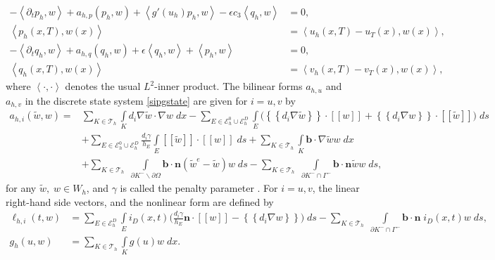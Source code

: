 \documentclass[preprint,12pt]{elsarticle}
\newcommand {\average}[1] {\mbox{$\left\{\!\!\left\{ #1 \right\}\!\!\right\}$}}
\newcommand {\jump}[1] {\mbox{$\left[\!\left[ #1 \right]\!\right]$}}
\newcommand {\la}[1] {\left\langle {#1} \right\rangle }
\begin{document}
\begin{equation}\label{sipgadj}
\begin{aligned}
-\la{ \partial_t p_h, w } + a_{h,p}(p_h,w) + \la{g'(u_h)p_h,w}-\epsilon c_3\la{q_h,w} &= 0, \\
\la{p_h(x,T),w(x)} &=  \la{ u_h(x, T)-u_T(x) ,w(x) },  \\
-\la{ \partial_t q_h, w } + a_{h,q}(q_h,w) + \epsilon \la{q_h,w}  + \la{p_h,w} &= 0, \\
 \la{q_h(x,T),w(x)} &=  \la{ v_h(x, T)-v_T(x) ,w(x) },
\end{aligned}
\end{equation}
where $\la{\cdot , \cdot}$ denotes the usual $L^2$-inner product. The bilinear forms $a_{h,u}$ and $a_{h,v}$ in the discrete state system \eqref{sipgstate} are given for $i=u,v$ by
\begin{equation*}
\begin{aligned}
a_{h,i}(\tilde{w},w)=& \sum \limits_{K \in \mathcal{T}_h} \int \limits_{K} d_i\nabla \tilde{w}  \cdot  \nabla w \; dx - \sum \limits_{E \in \mathcal{E}^0_h \cup \mathcal{E}^D_h} \int \limits_E \Big( \average{ d_i\nabla  \tilde{w}} \cdot \jump{w} + \average{ d_i\nabla w} \cdot \jump{\tilde{w}} \Big)  \; ds   \\
& + \sum \limits_{E \in \mathcal{E}^0_h \cup \mathcal{E}^D_h} \frac{d_i\gamma}{h_E} \int \limits_E \jump{\tilde{w}} \cdot \jump{w} \; ds + \sum \limits_{K \in \mathcal{T}_h} \int \limits_{K} \bm{b} \cdot \nabla \tilde{w} w  \; dx \\
&  + \sum \limits_{K \in \mathcal{T}_h}\; \int \limits_{\partial K^{-} \backslash \partial \Omega} \bm{b} \cdot \bm{n} (\tilde{w}^e-\tilde{w})w \; ds - \sum \limits_{K \in \mathcal{T}_h} \; \int \limits_{\partial K^{-} \cap \Gamma^{-}} \bm{b} \cdot \bm{n} \tilde{w} w  \; ds,
\end{aligned}
\end{equation*}
for any $\tilde{w},\;w \in W_h$, and $\gamma$ is called the penalty parameter \cite{riviere08dgm}.
For $i=u,v$, the linear right-hand side vectors, and the nonlinear form are defined by
\begin{align*}
\ell_{h,i}(t,w) &= \sum \limits_{E \in \mathcal{E}^D_h} \int \limits_E  i_{D}(x,t) \Big(\frac{d_i\gamma}{h_E} \bm{n} \cdot \jump{w} - \average{d_i \nabla w}  \Big)\; ds
 - \sum \limits_{K \in \mathcal{T}_h} \; \int \limits_{\partial K^{-} \cap \Gamma^{-}} \bm{b} \cdot \bm{n} \; i_{D}(x,t) w  \; ds,\\
g_h(u,w) &= \sum \limits_{K \in \mathcal{T}_h} \int \limits_{K} g(u)  w  \; dx.
\end{align*}
\end{document}
